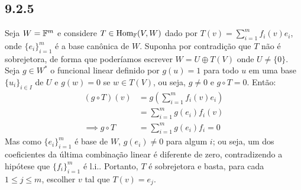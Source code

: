 \documentclass[../main.tex]{subfiles}
\begin{document}
    \subsection*{9.2.5}
    Seja $W=\mathbb{F}^m$ e considere \(T\in\text{Hom}_{\mathbb{F}}(V,W)\) dado por $T(v)=\sum_{i=1}^m f_i(v)e_i$, onde \(\{e_i\}_{i=1}^m\) é a base canônica de $W$. Suponha por contradição que $T$ não é sobrejetora, de forma que poderíamos escrever $W=U\oplus T(V)$ onde $U\neq\{0\}$. Seja $g\in W^*$ o funcional linear definido por $g(u)=1$ para todo $u$ em uma base $\{u_i\}_{i\in I}$ de $U$ e $g(w)=0$ se $w\in T(V)$, ou seja, $g\neq 0$ e $g\circ T =0$. Então:
    \begin{align*}
        (g\circ T) (v) &= g\left(\sum_{i=1}^m f_i(v)e_i\right)\\
        &= \sum_{i=1}^m g(e_i)f_i(v)\\
        \implies g\circ T &= \sum_{i=1}^m g(e_i)f_i = 0
    \end{align*}
    Mas como \(\{e_i\}_{i=1}^m\) é base de $W$, $g(e_i)\neq 0$ para algum $i$; ou seja, um dos coeficientes da última combinação linear é diferente de zero, contradizendo a hipótese que $\{f_i\}_{i=1}^m$ é l.i.. Portanto, $T$ é sobrejetora e basta, para cada $1\leq j\leq m$, escolher $v$ tal que $T(v)=e_j$.
\end{document}
